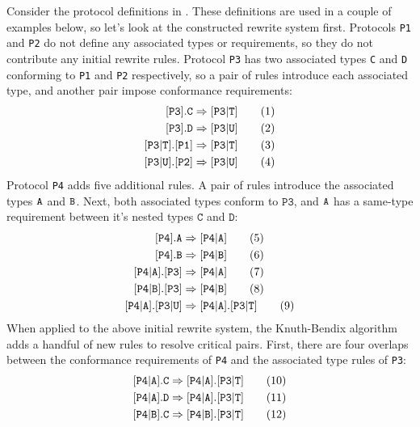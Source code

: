 \documentclass[../generics]{subfiles}
\begin{document}
\begin{example}\label{propmapexample1}
Consider the protocol definitions in . These definitions are used in a couple of examples below, so let's look at the constructed rewrite system first. Protocols \texttt{P1} and \texttt{P2} do not define any associated types or requirements, so they do not contribute any initial rewrite rules. Protocol \texttt{P3} has two associated types \texttt{C} and \texttt{D} conforming to \texttt{P1} and \texttt{P2} respectively, so a pair of rules introduce each associated type, and another pair impose conformance requirements:
\begin{align}
\protosym{P3}.\texttt{C}&\Rightarrow\assocsym{P3}{T}\tag{1}\\
\protosym{P3}.\texttt{D}&\Rightarrow\assocsym{P3}{U}\tag{2}\\
\assocsym{P3}{T}.\protosym{P1}&\Rightarrow\assocsym{P3}{T}\tag{3}\\
\assocsym{P3}{U}.\protosym{P2}&\Rightarrow\assocsym{P3}{U}\tag{4}
\end{align}
Protocol \texttt{P4} adds five additional rules. A pair of rules introduce the associated types $\texttt{A}$ and $\texttt{B}$. Next, both associated types conform to $\texttt{P3}$, and $\texttt{A}$ has a same-type requirement between it's nested types $\texttt{C}$ and $\texttt{D}$:
\begin{align}
\protosym{P4}.\nA&\Rightarrow\assocsym{P4}{A}\tag{5}\\
\protosym{P4}.\nB&\Rightarrow\assocsym{P4}{B}\tag{6}\\
\assocsym{P4}{A}.\protosym{P3}&\Rightarrow\assocsym{P4}{A}\tag{7}\\
\assocsym{P4}{B}.\protosym{P3}&\Rightarrow\assocsym{P4}{B}\tag{8}\\
\assocsym{P4}{A}.\assocsym{P3}{U}&\Rightarrow\assocsym{P4}{A}.\assocsym{P3}{T}\tag{9}
\end{align}
When applied to the above initial rewrite system, the Knuth-Bendix algorithm adds a handful of new rules to resolve critical pairs. First, there are four overlaps between the conformance requirements of \texttt{P4} and the associated type rules of \texttt{P3}:
\begin{align}
\assocsym{P4}{A}.\texttt{C}&\Rightarrow\assocsym{P4}{A}.\assocsym{P3}{T}\tag{10}\\
\assocsym{P4}{A}.\texttt{D}&\Rightarrow\assocsym{P4}{A}.\assocsym{P3}{T}\tag{11}\\
\assocsym{P4}{B}.\texttt{C}&\Rightarrow\assocsym{P4}{B}.\assocsym{P3}{T}\tag{12}\\

\end{align}
\end{example}
\end{document}
